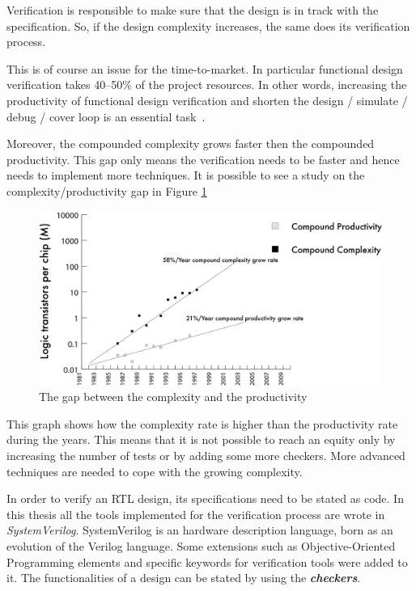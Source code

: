 Verification is responsible to make sure that the design is in track with the specification. So, if the design complexity increases, the same does its verification process.

This is of course an issue for the time-to-market. 
In particular functional design verification takes \mbox{40–50\%} of the project resources. In other words, increasing the productivity of functional design verification and shorten the design / simulate / debug / cover loop is an essential task~\cite{verification-book-2018}.

Moreover, the compounded complexity grows faster then the compounded productivity. This gap only means the verification needs to be faster and hence needs to implement more techniques.
It is possible to see a study on the complexity/productivity gap in Figure \ref{complexity-gap}
\begin{figure}[H]
    \centering
    \includegraphics[scale = 0.4]{Chapter_1/img/prod-compl.png}
    \caption{The gap between the complexity and the productivity~\cite{verification-book-2018}}
    \label{complexity-gap}
\end{figure}

This graph shows how the complexity rate is higher than the productivity rate during the years. This means that it is not possible to reach an equity only by increasing the number of tests or by adding some more checkers. More advanced techniques are needed to cope with the growing complexity.

In order to verify an RTL design, its specifications need to be stated as code. In this thesis all the tools implemented for the verification process are wrote in \emph{SystemVerilog}. 
SystemVerilog is an hardware description language, born as an evolution of the Verilog language. Some extensions such as Objective-Oriented Programming elements and speciﬁc keywords for verification tools were added to it. The functionalities of a design can be stated by using the \textbf{\emph{checkers}}.

